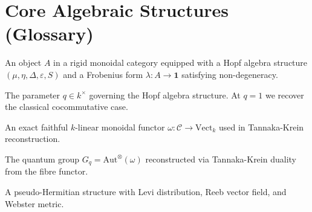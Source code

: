 \chapter{Core Algebraic Structures (Glossary)}

\begin{definition}
  \label{def:frobenius-hopf}
  An object $A$ in a rigid monoidal category equipped with a Hopf
  algebra structure $(\mu, \eta, \Delta, \varepsilon, S)$ and a
  Frobenius form $\lambda : A \to \mathbf{1}$ satisfying non-degeneracy.
\end{definition}

\begin{definition}
  \label{def:quantum-parameter}
  The parameter $q \in k^\times$ governing the Hopf algebra structure.
  At $q = 1$ we recover the classical cocommutative case.
\end{definition}

\begin{definition}
  \label{def:fibre-functor}
  An exact faithful $k$-linear monoidal functor
  $\omega : \mathcal{C} \to \mathrm{Vect}_k$ used in Tannaka-Krein
  reconstruction.
\end{definition}

\begin{definition}
  \label{def:quantum-gauge-group}
  The quantum group $G_q = \mathrm{Aut}^{\otimes}(\omega)$ reconstructed
  via Tannaka-Krein duality from the fibre functor.
\end{definition}

\begin{definition}
  \label{def:cr-manifold}
  A pseudo-Hermitian structure with Levi distribution, Reeb vector
  field, and Webster metric.
\end{definition}

